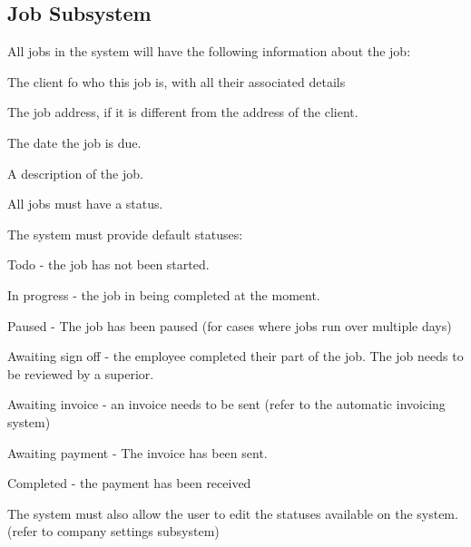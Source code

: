 \documentclass{article}
\begin{document}
	\subsection*{Job Subsystem}	
	\begin{list}{R.}{}
		\item All jobs in the system will have the following information about the job:
		\begin{list}{R.}{}
			\item The client fo who this job is, with all their associated details
			\item The job address, if it is different from the address of the client.
			\item The date the job is due.
			\item A description of the job.
		\end{list} 
		\item All jobs must have a status.
		\item The system must provide default statuses:
		\begin{list}{R.}{}
			\item Todo - the job has not been started.
			\item In progress -  the job in being completed at the moment. 
			\item Paused - The job has been paused (for cases where jobs run over multiple days)
			\item Awaiting sign off - the employee completed their part of the job. The job needs to be reviewed by a superior.
			\item Awaiting invoice - an invoice needs to be sent (refer to the automatic invoicing system)
			\item Awaiting payment - The invoice has been sent.
			\item Completed - the payment has been received
		\end{list}
		\item The system must also allow the user to edit the statuses available on the system.  (refer to company settings subsystem) 
	\end{list}
\end{document}
